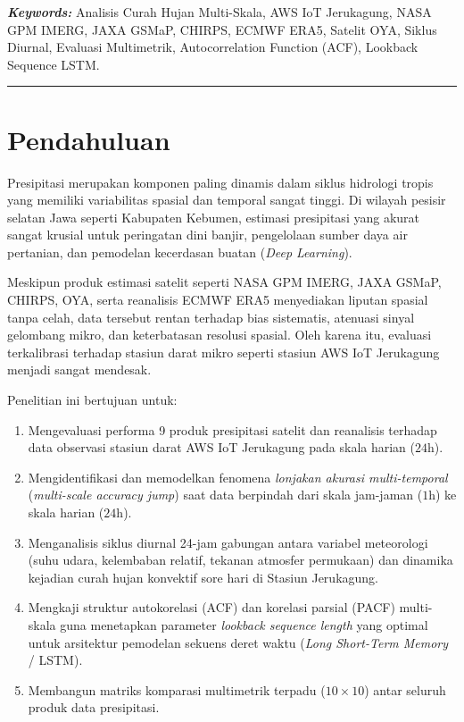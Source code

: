\documentclass[11pt,a4paper]{article}
\begin{document}
\vspace{0.2cm}
\noindent\textbf{\textit{Keywords:}} Analisis Curah Hujan Multi-Skala, AWS IoT Jerukagung, NASA GPM IMERG, JAXA GSMaP, CHIRPS, ECMWF ERA5, Satelit OYA, Siklus Diurnal, Evaluasi Multimetrik, Autocorrelation Function (ACF), Lookback Sequence LSTM.

\vspace{0.4cm}
\hrule
\vspace{0.4cm}

\section{Pendahuluan}
Presipitasi merupakan komponen paling dinamis dalam siklus hidrologi tropis yang memiliki variabilitas spasial dan temporal sangat tinggi. Di wilayah pesisir selatan Jawa seperti Kabupaten Kebumen, estimasi presipitasi yang akurat sangat krusial untuk peringatan dini banjir, pengelolaan sumber daya air pertanian, dan pemodelan kecerdasan buatan (\textit{Deep Learning}). 

Meskipun produk estimasi satelit seperti NASA GPM IMERG, JAXA GSMaP, CHIRPS, OYA, serta reanalisis ECMWF ERA5 menyediakan liputan spasial tanpa celah, data tersebut rentan terhadap bias sistematis, atenuasi sinyal gelombang mikro, dan keterbatasan resolusi spasial. Oleh karena itu, evaluasi terkalibrasi terhadap stasiun darat mikro seperti stasiun AWS IoT Jerukagung menjadi sangat mendesak.

Penelitian ini bertujuan untuk:
\begin{enumerate}[leftmargin=*]
    \item Mengevaluasi performa 9 produk presipitasi satelit dan reanalisis terhadap data observasi stasiun darat AWS IoT Jerukagung pada skala harian ($24\text{h}$).
    \item Mengidentifikasi dan memodelkan fenomena \textit{lonjakan akurasi multi-temporal} (\textit{multi-scale accuracy jump}) saat data berpindah dari skala jam-jaman ($1\text{h}$) ke skala harian ($24\text{h}$).
    \item Menganalisis siklus diurnal 24-jam gabungan antara variabel meteorologi (suhu udara, kelembaban relatif, tekanan atmosfer permukaan) dan dinamika kejadian curah hujan konvektif sore hari di Stasiun Jerukagung.
    \item Mengkaji struktur autokorelasi (ACF) dan korelasi parsial (PACF) multi-skala guna menetapkan parameter \textit{lookback sequence length} yang optimal untuk arsitektur pemodelan sekuens deret waktu (\textit{Long Short-Term Memory} / LSTM).
    \item Membangun matriks komparasi multimetrik terpadu ($10 \times 10$) antar seluruh produk data presipitasi.
\end{enumerate}
\end{document}
